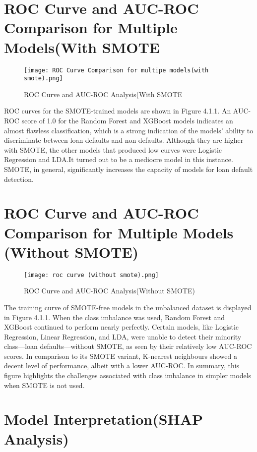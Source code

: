 \documentclass[12pt, a4paper,oneside]{book}
\numberwithin{equation}{section}
\begin{document}
\section{ROC Curve and AUC-ROC Comparison for Multiple Models(With SMOTE}
\begin{figure}[ht]
    \centering
    \texttt{[image: ROC Curve Comparison for multipe models(with smote).png]}
    \caption{ROC Curve and AUC-ROC Analysis(With SMOTE}
    \label{fig:enter-label}
\end{figure}
ROC curves for the SMOTE-trained models are shown in Figure 4.1.1. An AUC-ROC score of 1.0 for the Random Forest and XGBoost models indicates an almost flawless classification, which is a strong indication of the models' ability to discriminate between loan defaults and non-defaults. Although they are higher with SMOTE, the other models that produced low curves were Logistic Regression and LDA.It turned out to be a mediocre model in this instance. SMOTE, in general, significantly increases the capacity of models for loan default detection.

\section{ROC Curve and AUC-ROC Comparison for Multiple Models (Without SMOTE)}
\begin{figure}[ht]
    \centering
    \texttt{[image: roc curve (without smote).png]}
    \caption{ROC Curve and AUC-ROC Analysis(Without SMOTE)}
    \label{fig:enter-label}
\end{figure}
The training curve of SMOTE-free models in the unbalanced dataset is displayed in Figure 4.1.1. When the class imbalance was used, Random Forest and XGBoost continued to perform nearly perfectly. Certain models, like Logistic Regression, Linear Regression, and LDA, were unable to detect their minority class—loan defaults—without SMOTE, as seen by their relatively low AUC-ROC scores. In comparison to its SMOTE variant, K-nearest neighbours showed a decent level of performance, albeit with a lower AUC-ROC. In summary, this figure highlights the challenges associated with class imbalance in simpler models when SMOTE is not used.


\section{Model Interpretation(SHAP Analysis)}
\end{document}

